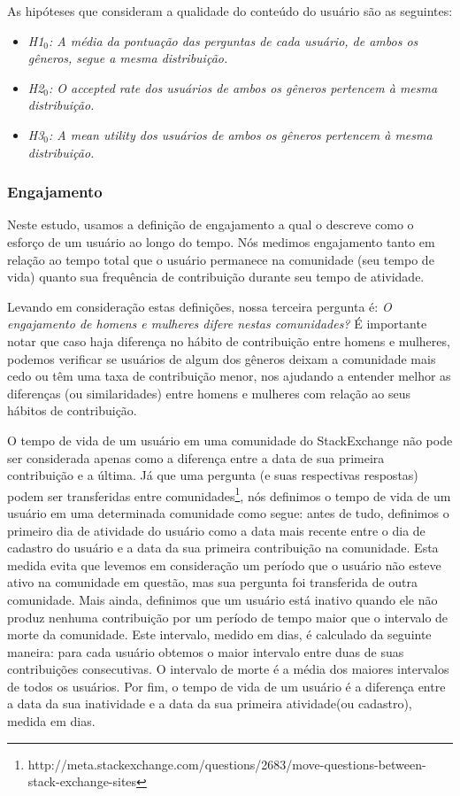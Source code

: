 
As hipóteses que consideram a qualidade do conteúdo do usuário são as seguintes:

\begin{itemize}
    \item \textit{H1$_0$: A média da pontuação das perguntas de cada usuário, de ambos os gêneros, segue a mesma distribuição.}
    \item \textit{H2$_0$: O accepted rate dos usuários de ambos os gêneros pertencem à mesma distribuição.}
    \item \textit{H3$_0$: A mean utility dos usuários de ambos os gêneros pertencem à mesma distribuição.}
\end{itemize}

\subsubsection{Engajamento}

Neste estudo, usamos a definição de engajamento a qual o descreve como o esforço de um usuário ao longo do tempo. Nós medimos engajamento tanto em relação ao tempo total que o usuário permanece na comunidade (seu tempo de vida) quanto sua frequência de contribuição durante seu tempo de atividade.

Levando em consideração estas definições, nossa terceira pergunta é: \textit{O engajamento de homens e mulheres difere nestas comunidades?} É importante notar que caso haja diferença no hábito de contribuição entre homens e mulheres, podemos verificar se usuários de algum dos gêneros deixam a comunidade mais cedo ou têm uma taxa de contribuição menor, nos ajudando a entender melhor as diferenças (ou similaridades) entre homens e mulheres com relação ao seus hábitos de contribuição.

O tempo de vida de um usuário em uma comunidade do StackExchange não pode ser considerada apenas como a diferença entre a data de sua primeira contribuição e a última. Já que uma pergunta (e suas respectivas respostas) podem ser transferidas entre comunidades\footnote{http://meta.stackexchange.com/questions/2683/move-questions-between-stack-exchange-sites}, nós definimos o tempo de vida de um usuário em uma determinada comunidade como segue: antes de tudo, definimos o primeiro dia de atividade do usuário como a data mais recente entre o dia de cadastro do usuário e a data da sua primeira contribuição na comunidade. Esta medida evita que levemos em consideração um período que o usuário não esteve ativo na comunidade em questão, mas sua pergunta foi transferida de outra comunidade. Mais ainda, definimos que um usuário está inativo quando ele não produz nenhuma contribuição por um período de tempo maior que o intervalo de morte da comunidade. Este intervalo, medido em dias, é calculado da seguinte maneira: para cada usuário obtemos o maior intervalo entre duas de suas contribuições consecutivas. O intervalo de morte é a média dos maiores intervalos de todos os usuários. Por fim, o tempo de vida de um usuário é a diferença entre a data da sua inatividade e a data da sua primeira atividade(ou cadastro), medida em dias.

